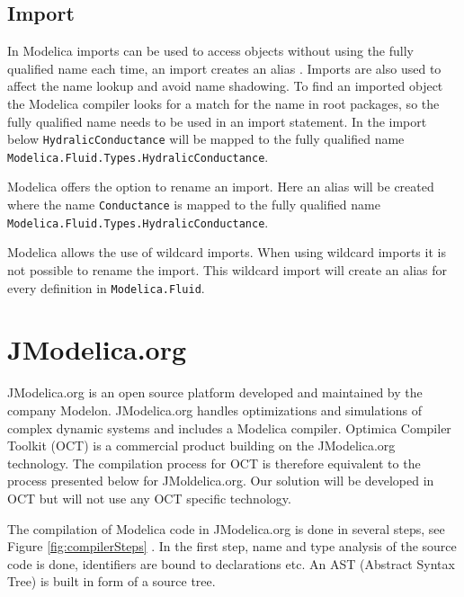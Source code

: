 \documentclass{cslthse-msc}
\begin{document}
\subsection{Import}
In Modelica imports can be used to access objects without using the fully qualified name each time, an import creates an alias \cite{tillermodelica}. Imports are also used to affect the name lookup and avoid name shadowing. To find an imported object the Modelica compiler looks for a match for the name in root packages, so the fully qualified name needs to be used in an import statement. In the import below \texttt{HydralicConductance} will be mapped to the fully qualified name \texttt{Modelica.Fluid.Types.HydralicConductance}.



Modelica offers the option to rename an import. Here an alias will be created where the name \texttt{Conductance} is mapped to the fully qualified name \\\texttt{Modelica.Fluid.Types.HydralicConductance}.



Modelica allows the use of wildcard imports. When using wildcard imports it is not possible to rename the import. This wildcard import will create an alias for every definition in \texttt{Modelica.Fluid}.



\section{JModelica.org}
JModelica.org is an open source platform developed and maintained by the company Modelon. JModelica.org  handles optimizations and simulations of complex dynamic systems and includes a Modelica compiler. Optimica Compiler Toolkit (OCT) is a commercial product building on the JModelica.org technology. The compilation process for OCT is therefore equivalent to the process presented below for JMoldelica.org. Our solution will be developed in OCT but will not use any OCT specific technology. 

The compilation of Modelica code in JModelica.org is done in several steps, see Figure \ref{fig:compilerSteps} \cite{aakesson2010implementation}. In the first step, name and type analysis of the source code is done, identifiers are bound to declarations etc. An AST (Abstract Syntax Tree) is built in form of a source tree.
\end{document}
